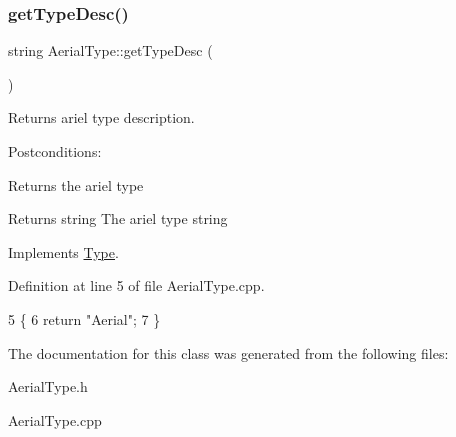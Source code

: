 \subsubsection{\texorpdfstring{get\+Type\+Desc()}{getTypeDesc()}}
{\footnotesize\ttfamily string Aerial\+Type\+::get\+Type\+Desc (\begin{DoxyParamCaption}{ }\end{DoxyParamCaption})\hspace{0.3cm}{\ttfamily [virtual]}}



Returns ariel type description. 

Postconditions\+:
\begin{DoxyItemize}
\item Returns the ariel type
\end{DoxyItemize}

\begin{DoxyReturn}{Returns}
string The ariel type string 
\end{DoxyReturn}


Implements \hyperlink{classType_a5c453300dc060252c30534110bd2f78c}{Type}.



Definition at line 5 of file Aerial\+Type.\+cpp.


\begin{DoxyCode}
5                                \{
6     \textcolor{keywordflow}{return} \textcolor{stringliteral}{"Aerial"};
7 \}
\end{DoxyCode}


The documentation for this class was generated from the following files\+:\begin{DoxyCompactItemize}
\item 
Aerial\+Type.\+h\item 
Aerial\+Type.\+cpp\end{DoxyCompactItemize}
